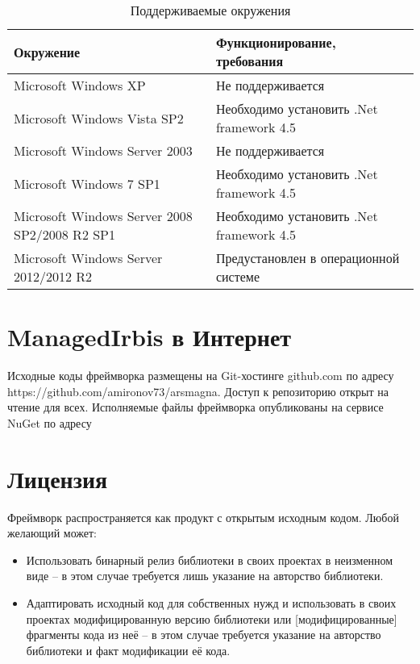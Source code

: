 \begin{table}[htbp]
	\centering
	\caption{Поддерживаемые окружения}
	\begin{tabular}{ | p{} | p{} | }
	\hline
	\textbf{Окружение} & 
	\textbf{Функционирование, требования}
	\\
	\hline
	\hline
	Microsoft Windows XP & Не поддерживается \\
	\hline
	Microsoft Windows Vista SP2 & Необходимо установить .Net framework 4.5 \\
	\hline
	Microsoft Windows Server 2003 & Не поддерживается \\
	\hline
	Microsoft Windows 7 SP1 & Необходимо установить .Net framework 4.5 \\
	\hline
	Microsoft Windows Server 2008 SP2/2008 R2 SP1 & Необходимо установить .Net framework 4.5 \\
	\hline
	Microsoft Windows Server 2012/2012 R2 & Предустановлен в операционной системе \\
	\hline
	\end{tabular}
\end{table}

\section*{ManagedIrbis в Интернет}

Исходные коды фреймворка размещены на Git-хостинге github.com по адресу https://github.com/amironov73/arsmagna. Доступ к репозиторию открыт на чтение для всех.
Исполняемые файлы фреймворка опубликованы на сервисе NuGet по адресу

\section*{Лицензия}

Фреймворк распространяется как продукт с открытым исходным кодом. Любой желающий может:

\begin{itemize}
	\item Использовать бинарный релиз библиотеки в своих проектах в неизменном виде – в этом случае требуется лишь указание на авторство библиотеки.
	\item Адаптировать исходный код для собственных нужд и использовать в своих проектах модифицированную версию библиотеки или [модифицированные] фрагменты кода из неё – в этом случае требуется указание на авторство библиотеки и факт модификации её кода.
\end{itemize}

